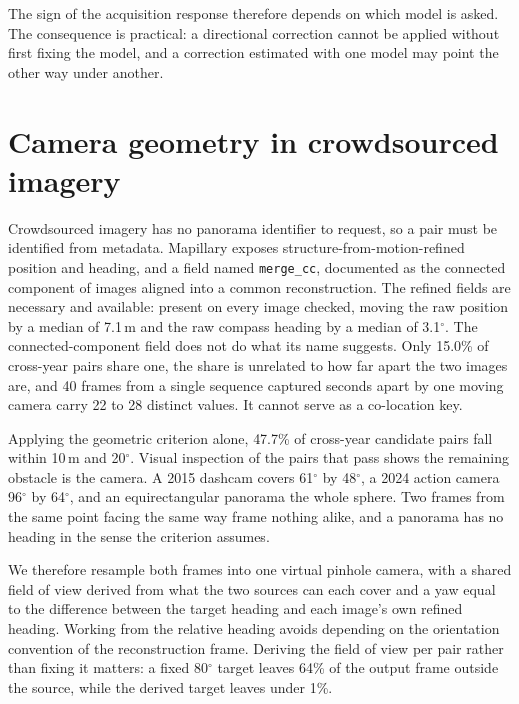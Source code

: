 The sign of the acquisition response therefore depends on which model is asked.
The consequence is practical: a directional correction cannot be applied without
first fixing the model, and a correction estimated with one model may point the
other way under another.

\section{Camera geometry in crowdsourced imagery}
\label{sec:optics}

Crowdsourced imagery has no panorama identifier to request, so a pair must be
identified from metadata. Mapillary exposes structure-from-motion-refined
position and heading, and a field named \texttt{merge\_cc}, documented as the
connected component of images aligned into a common reconstruction. The refined
fields are necessary and available: present on every image checked, moving the
raw position by a median of 7.1\,m and the raw compass heading by a median of
3.1$^\circ$. The connected-component field does not do what its name suggests.
Only 15.0\% of cross-year pairs share one, the share is unrelated to how far
apart the two images are, and 40 frames from a single sequence captured seconds
apart by one moving camera carry 22 to 28 distinct values. It cannot serve as a
co-location key.

Applying the geometric criterion alone, 47.7\% of cross-year candidate pairs fall
within 10\,m and 20$^\circ$. Visual inspection of the pairs that pass shows the
remaining obstacle is the camera. A 2015 dashcam covers 61$^\circ$ by
48$^\circ$, a 2024 action camera 96$^\circ$ by 64$^\circ$, and an
equirectangular panorama the whole sphere. Two frames from the same point facing
the same way frame nothing alike, and a panorama has no heading in the sense the
criterion assumes.

We therefore resample both frames into one virtual pinhole camera, with a shared
field of view derived from what the two sources can each cover and a yaw equal to
the difference between the target heading and each image's own refined heading.
Working from the relative heading avoids depending on the orientation convention
of the reconstruction frame. Deriving the field of view per pair rather than
fixing it matters: a fixed 80$^\circ$ target leaves 64\% of the output frame
outside the source, while the derived target leaves under 1\%.

